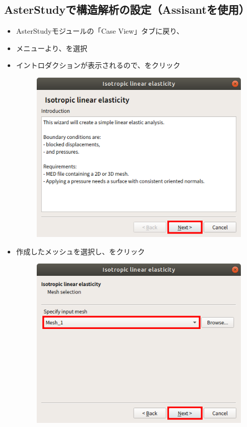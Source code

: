 \subsection{AsterStudyで構造解析の設定（Assisantを使用）}
\begin{itemize}
	\item AsterStudyモジュールの「Case View」タブに戻り、
	\item メニューより、を選択
	\item イントロダクションが表示されるので、をクリック
	      \begin{figure}[H]
		      \centering
		      \includegraphics{fig/meca001.png}
	      \end{figure}
	      \clearpage
	\item 作成したメッシュを選択し、をクリック
	      \begin{figure}[H]
		      \centering
		      \includegraphics{fig/meca002.png}

\end{figure}
\end{itemize}
